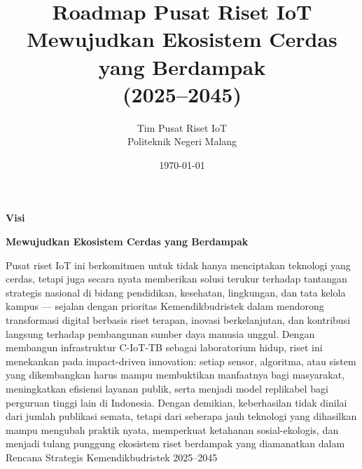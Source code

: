 \documentclass[11pt,a4paper]{article}
\title{\textbf{Roadmap Pusat Riset IoT \\ Mewujudkan Ekosistem Cerdas yang Berdampak \\ (2025–2045)}}
\author{Tim Pusat Riset IoT \\ [0.5em] \small Politeknik Negeri Malang}
\date{\today}
\newenvironment{vision}{%
  \begin{list}{}{%
    \setlength{\leftmargin}{1cm}%
    \setlength{\rightmargin}{1cm}%
    \setlength{\topsep}{1em}%
    \setlength{\partopsep}{0pt}%
    \setlength{\parsep}{0pt}%
    \setlength{\itemsep}{0pt}%
  }%
  \item\small
}{%
  \end{list}%
}
\begin{document}
\maketitle


\begin{vision}
    \begin{center}
        \textbf{\large Visi} \\
        \vspace{0.5em}
    \end{center}
    \begin{center}
        \textbf{Mewujudkan Ekosistem Cerdas yang Berdampak}\\
    \end{center}
    Pusat riset IoT ini berkomitmen untuk tidak hanya menciptakan teknologi yang cerdas, tetapi juga secara nyata memberikan solusi terukur terhadap tantangan strategis nasional di bidang pendidikan, kesehatan, lingkungan, dan tata kelola kampus — sejalan dengan prioritas Kemendikbudristek dalam mendorong transformasi digital berbasis riset terapan, inovasi berkelanjutan, dan kontribusi langsung terhadap pembangunan sumber daya manusia unggul. Dengan membangun infrastruktur C-IoT-TB sebagai laboratorium hidup, riset ini menekankan pada impact-driven innovation: setiap sensor, algoritma, atau sistem yang dikembangkan harus mampu membuktikan manfaatnya bagi masyarakat, meningkatkan efisiensi layanan publik, serta menjadi model replikabel bagi perguruan tinggi lain di Indonesia. Dengan demikian, keberhasilan tidak dinilai dari jumlah publikasi semata, tetapi dari seberapa jauh teknologi yang dihasilkan mampu mengubah praktik nyata, memperkuat ketahanan sosial-ekologis, dan menjadi tulang punggung ekosistem riset berdampak yang diamanatkan dalam Rencana Strategis Kemendikbudristek 2025–2045
\end{vision}
\end{document}
